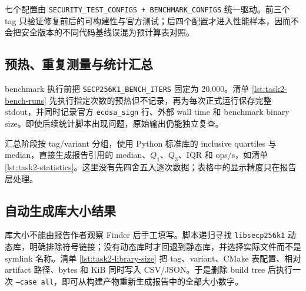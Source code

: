 \documentclass[11pt,a4paper,fontset=none]{ctexart}
\begin{document}
七个配置由 \texttt{SECURITY\_TEST\_CONFIGS + BENCHMARK\_CONFIGS} 统一驱动。前三个 tag 只验证修复前后的可构建性与官方测试；后四个配置才进入性能样本，因而不会把安全版本的不同代码基线误混为预计算表对照。

\subsection{预热、重复测量与统计汇总}

benchmark 执行前把 \texttt{SECP256K1\_BENCH\_ITERS} 固定为 20,000。清单 \ref{lst:task2-bench-runs} 先执行指定次数的预热但不记录，再为每次正式运行保存完整 stdout，并同时记录官方 \texttt{ecdsa\_sign} 行、外部 wall time 和 benchmark binary size。即使后续统计脚本出现问题，原始输出仍能独立复查。



汇总阶段按 tag/variant 分组，使用 Python 标准库的 inclusive quartiles 与 median，直接生成报告引用的 median、$Q_1$、$Q_3$、IQR 和 ops/s，如清单 \ref{lst:task2-statistics}。这里没有先四舍五入逐次数据；表格中的显示精度只在报告层处理。



\subsection{自动生成库大小结果}

库大小不能由报告作者观察 Finder 后手工填写。脚本递归寻找 \texttt{libsecp256k1} 动态库，明确排除符号链接；没有动态库时才回退到静态库，并选择实际文件而不是 symlink 名称。清单 \ref{lst:task2-library-size} 把 tag、variant、CMake 表配置、相对 artifact 路径、bytes 和 KiB 同时写入 CSV/JSON。于是删除 build tree 后执行一次 \texttt{--case all}，即可从构建产物重新生成报告中的全部大小数字。


\end{document}
